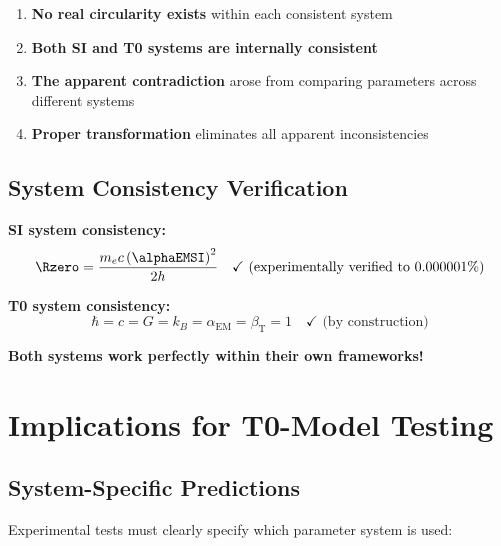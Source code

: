 	\begin{enumerate}
		\item \textbf{No real circularity exists} within each consistent system
		\item \textbf{Both SI and T0 systems are internally consistent}
		\item \textbf{The apparent contradiction} arose from comparing parameters across different systems
		\item \textbf{Proper transformation} eliminates all apparent inconsistencies
	\end{enumerate}
	
	\subsection{System Consistency Verification}
	\label{subsec:system_consistency}
	
	\textbf{SI system consistency:}
	$$\Rzero = \frac{m_e c \left(\alphaEMSI\right)^2}{2h} \quad \checkmark \text{ (experimentally verified to 0.000001\%)}$$
	
	\textbf{T0 system consistency:}
	$$\hbar = c = G = k_B = \alpha_{\text{EM}} = \beta_{\text{T}} = 1 \quad \checkmark \text{ (by construction)}$$
	
	\textbf{Both systems work perfectly within their own frameworks!}
	
	\section{Implications for T0-Model Testing}
	\label{sec:testing_implications}
	
	\subsection{System-Specific Predictions}
	\label{subsec:system_specific_predictions}
	
	Experimental tests must clearly specify which parameter system is used:
	
	\begin{table}[htbp]
		\centering
		\caption{System-specific experimental predictions}
		\label{tab:system_predictions}
	\end{table}
	
